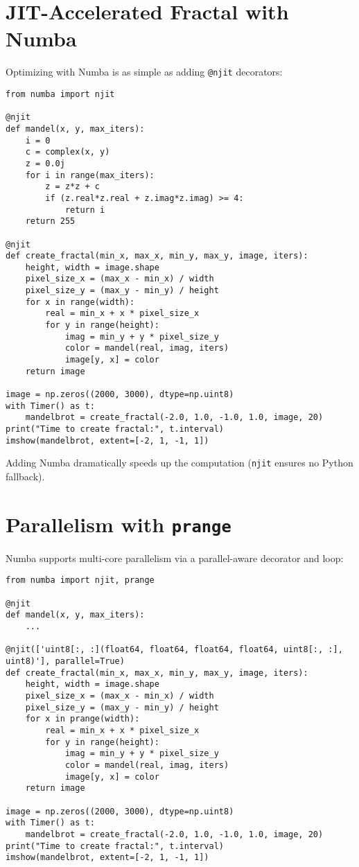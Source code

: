 \documentclass[11pt,a4paper]{book}
\begin{document}
\section{JIT-Accelerated Fractal with Numba}

Optimizing with Numba is as simple as adding \texttt{@njit} decorators:

\begin{lstlisting}
from numba import njit

@njit
def mandel(x, y, max_iters):
    i = 0
    c = complex(x, y)
    z = 0.0j
    for i in range(max_iters):
        z = z*z + c
        if (z.real*z.real + z.imag*z.imag) >= 4:
            return i
    return 255

@njit
def create_fractal(min_x, max_x, min_y, max_y, image, iters):
    height, width = image.shape
    pixel_size_x = (max_x - min_x) / width
    pixel_size_y = (max_y - min_y) / height
    for x in range(width):
        real = min_x + x * pixel_size_x
        for y in range(height):
            imag = min_y + y * pixel_size_y
            color = mandel(real, imag, iters)
            image[y, x] = color
    return image

image = np.zeros((2000, 3000), dtype=np.uint8)
with Timer() as t:
    mandelbrot = create_fractal(-2.0, 1.0, -1.0, 1.0, image, 20)
print("Time to create fractal:", t.interval)
imshow(mandelbrot, extent=[-2, 1, -1, 1])
\end{lstlisting}

Adding Numba dramatically speeds up the computation (\texttt{njit} ensures no Python fallback).

\section{Parallelism with \texttt{prange}}
Numba supports multi-core parallelism via a parallel-aware decorator and loop:

\begin{lstlisting}
from numba import njit, prange

@njit
def mandel(x, y, max_iters):
    ...

@njit(['uint8[:, :](float64, float64, float64, float64, uint8[:, :], uint8)'], parallel=True)
def create_fractal(min_x, max_x, min_y, max_y, image, iters):
    height, width = image.shape
    pixel_size_x = (max_x - min_x) / width
    pixel_size_y = (max_y - min_y) / height
    for x in prange(width):
        real = min_x + x * pixel_size_x
        for y in range(height):
            imag = min_y + y * pixel_size_y
            color = mandel(real, imag, iters)
            image[y, x] = color
    return image

image = np.zeros((2000, 3000), dtype=np.uint8)
with Timer() as t:
    mandelbrot = create_fractal(-2.0, 1.0, -1.0, 1.0, image, 20)
print("Time to create fractal:", t.interval)
imshow(mandelbrot, extent=[-2, 1, -1, 1])
\end{lstlisting}
\end{document}
